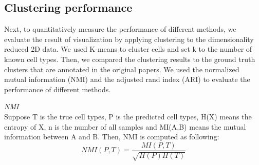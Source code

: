 \begin{table}[htb!]
\centering
\caption{scRNA-seq datasets used in this study}
\label{datasets}
\end{table}

\subsection{Clustering performance}
Next, to quantitatively measure the performance of different methods, we evaluate the result of visualization by applying clustering to the dimensionality reduced 2D data. We used K-means to cluster cells and set k to the number of known cell types. Then, we compared the clustering results to the ground truth clusters that are annotated in the original papers. We used the normalized mutual information (NMI) \cite{strehl2002cluster} and the adjusted rand index (ARI) \cite{hubert1985comparing} to evaluate the performance of different methods. 

\vspace{0.5cm}
\noindent\emph{NMI} \\
Suppose T is the true cell types, P is the predicted cell types, H(X) means the entropy of X, n is the number of all samples and MI(A,B) means the mutual information between A and B. Then, NMI is computed as following:
\begin{equation}
    NMI(P, T)=\frac{MI(P, T)}{\sqrt{H(P) H(T)}}
\end{equation}

